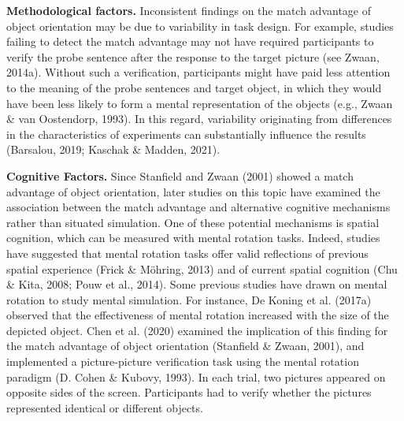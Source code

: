 \documentclass[
  man,floatsintext]{apa7}
\begin{document}
\textbf{Methodological factors.} Inconsistent findings on the match advantage
of object orientation may be due to variability in task design. For
example, studies failing to detect the match advantage may not have
required participants to verify the probe sentence after the response to
the target picture (see Zwaan, 2014a). Without such a
verification, participants might have paid less attention to the meaning
of the probe sentences and target object, in which they would have been
less likely to form a mental representation of the objects (e.g., Zwaan \& van Oostendorp, 1993). In this regard, variability
originating from differences in the characteristics of experiments can
substantially influence the results
(Barsalou, 2019; Kaschak \& Madden, 2021).

\textbf{Cognitive Factors.} Since Stanfield and Zwaan (2001) showed a match
advantage of object orientation, later studies on this topic have
examined the association between the match advantage and alternative
cognitive mechanisms rather than situated simulation. One of these
potential mechanisms is spatial cognition, which can be measured with
mental rotation tasks. Indeed, studies have suggested that mental
rotation tasks offer valid reflections of previous spatial experience
(Frick \& Möhring, 2013) and of current spatial cognition
(Chu \& Kita, 2008; Pouw et al., 2014). Some
previous studies have drawn on mental rotation to study mental
simulation. For instance, De Koning et al. (2017a) observed that the
effectiveness of mental rotation increased with the size of the depicted
object. Chen et al. (2020) examined the implication of this finding
for the match advantage of object orientation (Stanfield \& Zwaan, 2001),
and implemented a picture-picture verification task using the mental
rotation paradigm (D. Cohen \& Kubovy, 1993). In each trial, two
pictures appeared on opposite sides of the screen. Participants had to
verify whether the pictures represented identical or different objects.
\end{document}
